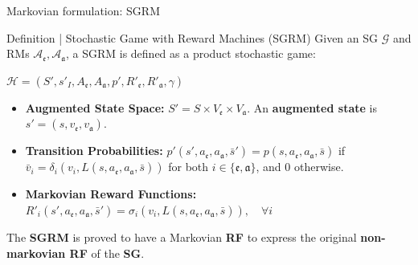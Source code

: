 \documentclass[10pt, aspectratio=169]{beamer}
\newcommand{\evidenzia}[1]{\textcolor{verdeSalvia}{\textbf{#1}}}
\begin{document}
\begin{frame}{Markovian formulation: SGRM}

    \begin{block}{Definition | Stochastic Game with Reward Machines (SGRM)}
        \vspace{0.2cm}Given an SG $\mathcal{G}$ and RMs $\mathcal{A}_{\mathfrak{e}}, \mathcal{A}_{\mathfrak{a}}$, a SGRM is defined as a product stochastic game:

        \begin{center}
            $\mathcal{H} = (S', s'_I, A_{\mathfrak{e}}, A_{\mathfrak{a}}, p', R'_{\mathfrak{e}}, R'_{\mathfrak{a}}, \gamma)$
        \end{center}

        \begin{itemize}
            \item \textbf{Augmented State Space:} $S' = S \times V_{\mathfrak{e}} \times V_{\mathfrak{a}}$. An \evidenzia{augmented state} is $s' = (s, v_{\mathfrak{e}}, v_{\mathfrak{a}})$.
            \item \textbf{Transition Probabilities:} $p'(s', a_{\mathfrak{e}}, a_{\mathfrak{a}}, \bar{s}') = p(s, a_{\mathfrak{e}}, a_{\mathfrak{a}}, \bar{s})$ if $\bar{v}_i = \delta_i(v_i, L(s, a_{\mathfrak{e}}, a_{\mathfrak{a}}, \bar{s}))$ for both $i \in \{\mathfrak{e}, \mathfrak{a}\}$, and $0$ otherwise.
            \item \textbf{Markovian Reward Functions:} $R'_i(s', a_{\mathfrak{e}}, a_{\mathfrak{a}}, \bar{s}') = \sigma_i(v_i, L(s, a_{\mathfrak{e}}, a_{\mathfrak{a}}, \bar{s})),\quad \forall i$
        \end{itemize}
    \end{block}
    \vspace{0.2cm}
    The \evidenzia{SGRM} is proved to have a Markovian \evidenzia{RF} to express the original \evidenzia{non-markovian RF} of the \evidenzia{SG}.

\end{frame}
\end{document}

